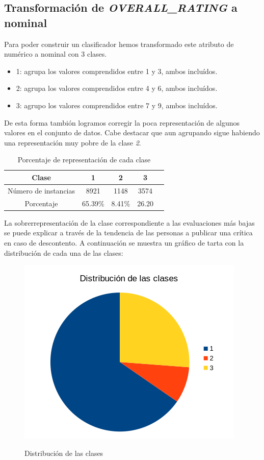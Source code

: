 \documentclass[es]{uc3mreport}
\begin{document}
\begin{report}
\subsection{Transformación de \textit{OVERALL\_RATING} a nominal}
\label{sec:overalltransform}
Para poder construir un clasificador hemos transformado este atributo de numérico a nominal con 3 clases.
\begin{itemize}
    \item 1: agrupa los valores comprendidos entre 1 y 3, ambos incluídos.
    \item 2: agrupa los valores comprendidos entre 4 y 6, ambos incluídos.
    \item 3: agrupo los valores comprendidos entre 7 y 9, ambos incluídos.
\end{itemize}

De esta forma tambión logramos corregir la poca representación de algunos valores en el conjunto de datos. Cabe destacar que aun agrupando sigue habiendo una representación muy pobre de la clase \textit{2}.

\begin{table}[H]
    \begin{center}
        \begin{tabular}{@{}ccccc@{}}
            \toprule
            Clase                & 1              & 2      & 3\\ 
            \midrule
            Número de instancias & 8921           & 1148   & 3574 \\ 
            Porcentaje           & 65.39\%        & 8.41\% & 26.20\\ 
            \bottomrule
        \end{tabular} 
        \caption{Porcentaje de representación de cada clase}
    \end{center}
\end{table}

La sobrerrepresentación de la clase correspondiente a las evaluaciones más bajas se puede explicar a través de la tendencia de las personas a publicar una crítica en caso de descontento. A continuación se muestra un gráfico de tarta con la distribución de cada una de las clases:

\begin{figure}[H]
    \center
    \includegraphics[width=0.60\linewidth]{overall_clases.png}\\ 
    \caption{Distribución de las clases}
\end{figure}


\end{report}
\end{document}
